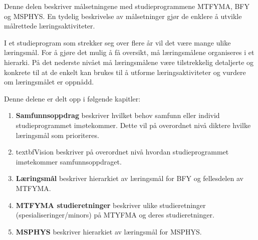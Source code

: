 Denne delen beskriver målsetningene med studieprogrammene MTFYMA, BFY og MSPHYS. En tydelig beskrivelse av målsetninger gjør de enklere å utvikle målrettede læringsaktiviteter.

I et studieprogram som strekker seg over flere år vil det være mange ulike læringsmål. For å gjøre det mulig å få oversikt, må læringsmålene organiseres i et hierarki. På det nederste nivået må læringsmålene være tilstrekkelig detaljerte og konkrete til at de enkelt kan brukes til å utforme læringsaktiviteter og vurdere om læringsmålet er oppnådd.

Denne delene er delt opp i følgende kapitler:

\begin{enumerate}
   \item \textbf{Samfunnsoppdrag} beskriver hvilket behov samfunn eller individ studieprogrammet imøtekommer. Dette vil på overordnet nivå diktere hvilke læringsmål som prioriteres.
   \item textbf{Vision} beskriver på overordnet nivå hvordan studieprogrammet imøtekommer samfunnsoppdraget.
   \item \textbf{Læringsmål} beskriver hierarkiet av læringsmål for BFY og fellesdelen av MTFYMA.
   \item \textbf{MTFYMA studieretninger} beskriver ulike studieretninger (spesialiseringer/minors) på MTYFMA og deres studieretninger.
   \item \textbf{MSPHYS} beskriver hierarkiet av læringsmål for MSPHYS.
\end{enumerate}
